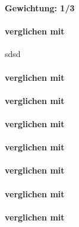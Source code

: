 \textbf{Gewichtung: 1/3}


\paragraph*{ verglichen mit }
sdsd
\paragraph*{ verglichen mit }


\paragraph*{ verglichen mit }

\paragraph*{ verglichen mit }

\paragraph*{ verglichen mit }

\paragraph*{ verglichen mit }

\paragraph*{ verglichen mit }

\paragraph*{ verglichen mit }




